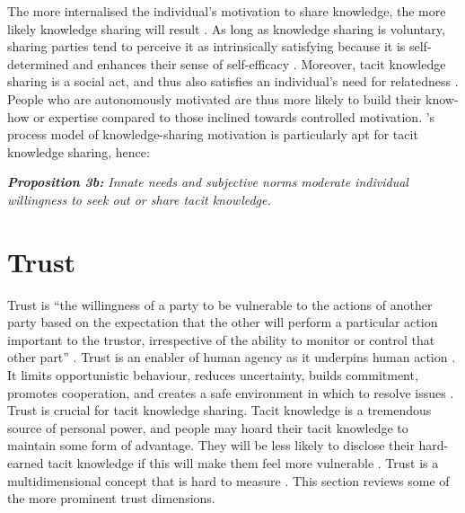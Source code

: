 The more internalised the individual's motivation to share knowledge, the more likely knowledge sharing will result \citep{gagne2009model,witherspoon2013antecedents}. As long as knowledge sharing is voluntary, sharing parties tend to perceive it as intrinsically satisfying because it is self-determined and enhances their sense of self-efficacy \citep{lam2010knowledge,dumbach2014establishing}. Moreover, tacit knowledge sharing is a social act, and thus also satisfies an individual's need for relatedness \citep{llopis2016understanding}. People who are autonomously motivated are thus more likely to build their know-how or expertise compared to those inclined towards controlled motivation. \citeauthor{gagne2009model}'s \citeyearpar{gagne2009model} process model of knowledge-sharing motivation is particularly apt for tacit knowledge sharing, hence: \bigskip

\begin{tcolorbox}
\textit{\textbf{Proposition 3b:} Innate needs and subjective norms moderate individual willingness to seek out or share tacit knowledge.}
\end{tcolorbox}

\section{Trust}

Trust is \enquote{the willingness of a party to be vulnerable to the actions of another party based on the expectation that the other will perform a particular action important to the trustor, irrespective of the ability to monitor or control that other part} \citep[][pg.~712]{mayer1995integrative}. Trust is an enabler of human agency as it underpins human action \citep{muller2008living,mcevily2011measuring}. It limits opportunistic behaviour, reduces uncertainty, builds commitment, promotes cooperation, and creates a safe environment in which to resolve issues \citep{nonaka1994dynamic,panteli2005trust,rasmussen2007work}. Trust is crucial for tacit knowledge sharing. Tacit knowledge is a tremendous source of personal power, and people may hoard their tacit knowledge to maintain some form of advantage. They will be less likely to disclose their hard-earned tacit knowledge if this will make them feel more vulnerable  \citep{levin2004strength,kankanhalli2005contributing,riege2005three,lin2007share,milne2007motivation,alsharo2017virtual}. Trust is a multidimensional concept that is hard to measure \citep{castelfranchi2008trust}. This section reviews some of the more prominent trust dimensions. 

